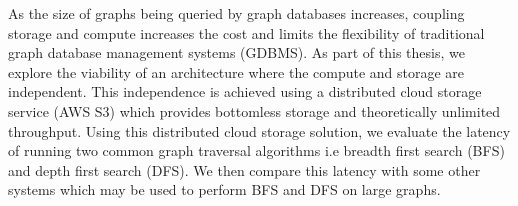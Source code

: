 As the size of graphs being queried by graph databases increases, coupling 
storage and compute increases the cost and limits the flexibility of
traditional graph database management systems (GDBMS). As part of this thesis,
we explore the viability of an architecture where the compute and storage are
independent. This independence is achieved using a distributed cloud storage
service (AWS S3) which provides bottomless storage and theoretically unlimited
throughput. Using this distributed cloud storage solution, we evaluate the
latency of running two common graph traversal algorithms i.e breadth first
search (BFS) and depth first search (DFS). We then compare this latency with
some other systems which may be used to perform BFS and DFS on large graphs. 
